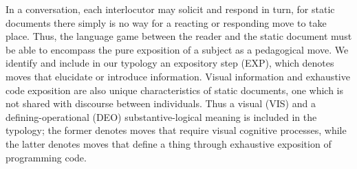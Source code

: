 \documentclass[conference]{IEEEtran}
\begin{document}
In a conversation, each interlocutor may solicit and respond in turn, for static
documents there simply is no way for a reacting or responding move to take
place. Thus, the language game between the reader and the static document must
be able to encompass the pure exposition of a subject as a pedagogical move. We
identify and include in our typology an expository step (EXP), which denotes
moves that elucidate or introduce information. Visual information and exhaustive
code exposition are also unique characteristics of static documents, one which
is not shared with discourse between individuals. Thus a visual (VIS) and a
defining-operational (DEO) substantive-logical meaning is included in the
typology; the former denotes moves that require visual cognitive processes,
while the latter denotes moves that define a thing through exhaustive exposition
of programming code.
\end{document}
